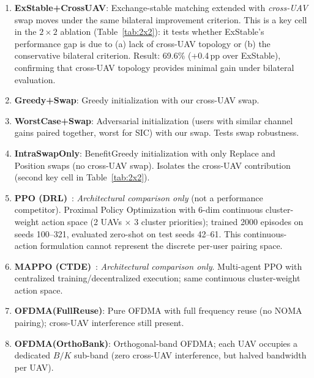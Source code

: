 \documentclass[journal]{IEEEtran}
\newtheorem{remark}{Remark}
\begin{document}
\begin{enumerate}
\begin{remark}[Identity of ExchangeStable vs.\ Gale-Shapley Stable Matching]
(b)~\emph{Matching with externalities}~\cite{pantisano2015matching}: externalities are accounted for in \emph{how we evaluate} each candidate swap (full cross-UAV SINR model), but the \emph{acceptance rule} uses the bilateral criterion, not an externality-aware stability notion.
The 0/660 cross-UAV bilateral acceptance rate is an empirical consequence of nearest-UAV assignment: moving a user to a more distant UAV weakens its received power at the new pair, so the bilateral criterion is never satisfied in our deployment geometry.
\end{remark}
    \item \textbf{ExStable+CrossUAV}: Exchange-stable matching extended with \emph{cross-UAV} swap moves under the same bilateral improvement criterion. This is a key cell in the $2\!\times\!2$ ablation (Table~\ref{tab:2x2}): it tests whether ExStable's performance gap is due to (a) lack of cross-UAV topology or (b) the conservative bilateral criterion. Result: 69.6\% (+0.4\,pp over ExStable), confirming that cross-UAV topology provides minimal gain under bilateral evaluation.
    \item \textbf{Greedy+Swap}: Greedy initialization with our cross-UAV swap.
    \item \textbf{WorstCase+Swap}: Adversarial initialization (users with similar channel gains paired together, worst for SIC) with our swap. Tests swap robustness.
    \item \textbf{IntraSwapOnly}: BenefitGreedy initialization with only Replace and Position swaps (no cross-UAV swap). Isolates the cross-UAV contribution (second key cell in Table~\ref{tab:2x2}).
    \item \textbf{PPO (DRL)}~\cite{zhou2024multiuav}: \emph{Architectural comparison only} (not a performance competitor). Proximal Policy Optimization with 6-dim continuous cluster-weight action space (2 UAVs $\times$ 3 cluster priorities); trained 2000 episodes on seeds 100--321, evaluated zero-shot on test seeds 42--61. This continuous-action formulation cannot represent the discrete per-user pairing space.
    \item \textbf{MAPPO (CTDE)}~\cite{yu2022mappo}: \emph{Architectural comparison only}. Multi-agent PPO with centralized training/decentralized execution; same continuous cluster-weight action space.
    \item \textbf{OFDMA(FullReuse)}: Pure OFDMA with full frequency reuse (no NOMA pairing); cross-UAV interference still present.
    \item \textbf{OFDMA(OrthoBank)}: Orthogonal-band OFDMA; each UAV occupies a dedicated $B/K$ sub-band (zero cross-UAV interference, but halved bandwidth per UAV).
\end{enumerate}
\end{document}
